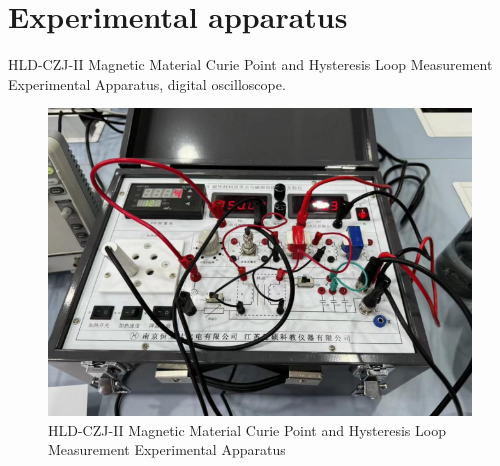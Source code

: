 \documentclass[UTF8]{article}
\begin{document}
	\section{Experimental apparatus}
    HLD-CZJ-II Magnetic Material Curie Point and Hysteresis Loop Measurement Experimental Apparatus, digital oscilloscope.
    
	\begin{figure}[H]
	    	\centering
	    	\includegraphics[clip,scale=0.9,trim={0 0 0 0}]{fig/fig1.png}
	        \caption{HLD-CZJ-II Magnetic Material Curie Point and Hysteresis Loop Measurement Experimental Apparatus}
	        \label{figure.1}
    \end{figure}    
    
\end{document}
